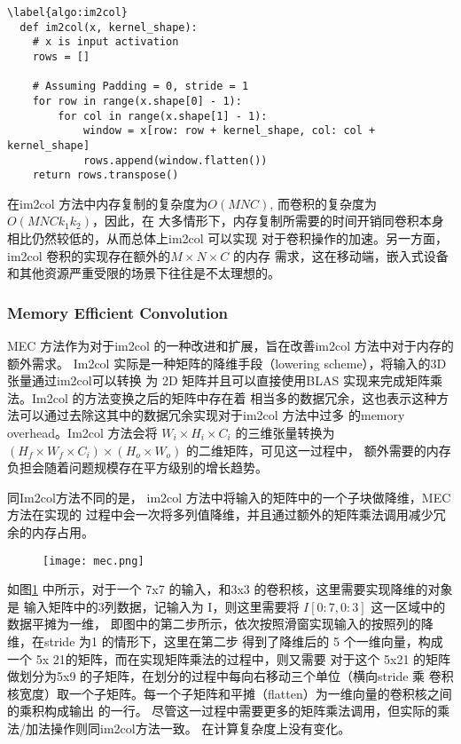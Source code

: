 \begin{lstlisting}
\label{algo:im2col}
  def im2col(x, kernel_shape):
    # x is input activation
    rows = []

    # Assuming Padding = 0, stride = 1
    for row in range(x.shape[0] - 1):
        for col in range(x.shape[1] - 1):
            window = x[row: row + kernel_shape, col: col + kernel_shape]
            rows.append(window.flatten())
    return rows.transpose()
\end{lstlisting}

在im2col 方法中内存复制的复杂度为$O(MNC)$, 而卷积的复杂度为 $O(MNCk_1k_2)$，因此，在
大多情形下，内存复制所需要的时间开销同卷积本身相比仍然较低的，从而总体上im2col 可以实现
对于卷积操作的加速。另一方面，im2col 卷积的实现存在额外的$M\times N \times C$ 的内存
需求，这在移动端，嵌入式设备和其他资源严重受限的场景下往往是不太理想的。

\subsubsection{Memory Efficient Convolution}

MEC 方法\cite{Cho2017MECMC}作为对于im2col 的一种改进和扩展，旨在改善im2col 方法中对于内存的额外需求。
Im2col 实际是一种矩阵的降维手段（lowering scheme），将输入的3D 张量通过im2col可以转换
为 2D 矩阵并且可以直接使用BLAS 实现来完成矩阵乘法。Im2col 的方法变换之后的矩阵中存在着
相当多的数据冗余，这也表示这种方法可以通过去除这其中的数据冗余实现对于im2col 方法中过多
的memory overhead。Im2col 方法会将 $ W_i \times H_i \times C_i $ 的三维张量转换为 
$(H_f \times W_f \times C_i) \times (H_o \times W_o) $ 的二维矩阵，可见这一过程中，
额外需要的内存负担会随着问题规模存在平方级别的增长趋势。

同Im2col方法不同的是， im2col 方法中将输入的矩阵中的一个子块做降维，MEC 方法在实现的
过程中会一次将多列值降维，并且通过额外的矩阵乘法调用减少冗余的内存占用。

\begin{figure}
  \label{fig:mec}
  \texttt{[image: mec.png]}
\end{figure}

如图\ref{fig:mec} 中所示，对于一个 7x7 的输入，和3x3 的卷积核，这里需要实现降维的对象是
输入矩阵中的3列数据，记输入为 I，则这里需要将 $ I[0:7, 0:3] $ 这一区域中的数据平摊为一维，
即图中的第二步所示，依次按照滑窗实现输入的按照列的降维，在stride 为1 的情形下，这里在第二步
得到了降维后的 5 个一维向量，构成一个 5x 21的矩阵，而在实现矩阵乘法的过程中，则又需要
对于这个 5x21 的矩阵做划分为5x9 的子矩阵，在划分的过程中每向右移动三个单位（横向stride 乘
卷积核宽度）取一个子矩阵。每一个子矩阵和平摊（flatten）为一维向量的卷积核之间的乘积构成输出
的一行。 尽管这一过程中需要更多的矩阵乘法调用，但实际的乘法/加法操作则同im2col方法一致。
在计算复杂度上没有变化。

